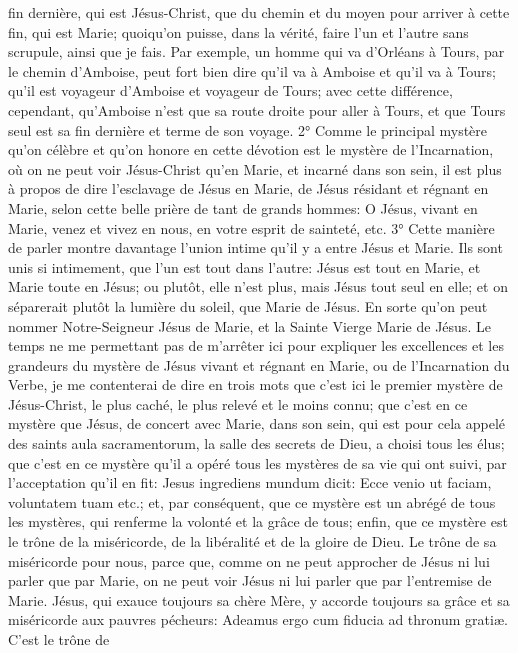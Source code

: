 fin dernière, qui est Jésus-Christ, que du chemin et du moyen pour arriver à cette fin, qui est Marie; quoiqu'on
puisse, dans la vérité, faire l'un et l'autre sans scrupule, ainsi que je fais. Par exemple, un homme qui va d'Orléans
à Tours, par le chemin d'Amboise, peut fort bien dire qu'il va à Amboise et qu'il va à Tours; qu'il est voyageur
d'Amboise et voyageur de Tours; avec cette différence, cependant, qu'Amboise n'est que sa route droite pour aller
à Tours, et que Tours seul est sa fin dernière et terme de son voyage.
 2° Comme le principal mystère qu'on célèbre et qu'on honore en cette dévotion est le mystère de
l'Incarnation, où on ne peut voir Jésus-Christ qu'en Marie, et incarné dans son sein, il est plus à propos de dire
l'esclavage de Jésus en Marie, de Jésus résidant et régnant en Marie, selon cette belle prière de tant de grands
hommes: O Jésus, vivant en Marie, venez et vivez en nous, en votre esprit de sainteté, etc.
 3° Cette manière de parler montre davantage l'union intime qu'il y a entre Jésus et Marie. Ils sont unis si
intimement, que l'un est tout dans l'autre: Jésus est tout en Marie, et Marie toute en Jésus; ou plutôt, elle n'est
plus, mais Jésus tout seul en elle; et on séparerait plutôt la lumière du soleil, que Marie de Jésus. En sorte qu'on
peut nommer Notre-Seigneur Jésus de Marie, et la Sainte Vierge Marie de Jésus.
 Le temps ne me permettant pas de m'arrêter ici pour expliquer les excellences et les grandeurs du mystère
de Jésus vivant et régnant en Marie, ou de l'Incarnation du Verbe, je me contenterai de dire en trois mots que c'est
ici le premier mystère de Jésus-Christ, le plus caché, le plus relevé et le moins connu; que c'est en ce mystère que
Jésus, de concert avec Marie, dans son sein, qui est pour cela appelé des saints aula sacramentorum, la salle des
secrets de Dieu, a choisi tous les élus; que c'est en ce mystère qu'il a opéré tous les mystères de sa vie qui ont
suivi, par l'acceptation qu'il en fit: Jesus ingrediens mundum dicit: Ecce venio ut faciam, voluntatem tuam etc.; et,
par conséquent, que ce mystère est un abrégé de tous les mystères, qui renferme la volonté et la grâce de tous;
enfin, que ce mystère est le trône de la miséricorde, de la libéralité et de la gloire de Dieu. Le trône de sa
miséricorde pour nous, parce que, comme on ne peut approcher de Jésus ni lui parler que par Marie, on ne peut
voir Jésus ni lui parler que par l'entremise de Marie. Jésus, qui exauce toujours sa chère Mère, y accorde toujours
sa grâce et sa miséricorde aux pauvres pécheurs: Adeamus ergo cum fiducia ad thronum gratiæ. C'est le trône de
